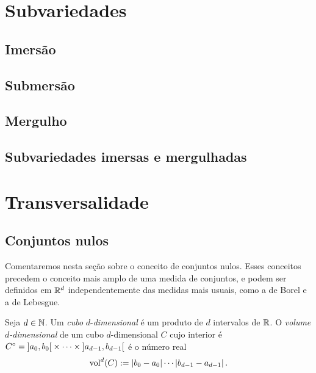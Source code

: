 \section{Subvariedades}

\subsection{Imersão}

\subsection{Submersão}

\subsection{Mergulho}

\subsection{Subvariedades imersas e mergulhadas}








\section{Transversalidade}

\subsection{Conjuntos nulos}

Comentaremos nesta seção sobre o conceito de conjuntos nulos. Esses conceitos precedem o conceito mais amplo de uma medida de conjuntos, e podem ser definidos em $\mathbb{R}^d$ independentemente das medidas mais usuais, como a de Borel e a de Lebesgue.

\begin{definition}
Seja $d \in \mathbb{N}$. Um \emph{cubo} $d$-\emph{dimensional} é um produto de $d$ intervalos de $\mathbb{R}$. O \emph{volume $d$-dimensional} de um cubo $d$-dimensional $C$ cujo interior é ${C}^\circ = \left]{a_0},{b_0}\right[ \times \cdots \times \left]{a_{d-1}},{b_{d-1}}\right[$ é o número real
	\begin{equation*}
	\operatorname{vol}^d(C) := \left\vert{b_0 - a_0}\right\vert\cdots\left\vert{b_{d-1} - a_{d-1}}\right\vert.
	\end{equation*}
\end{definition}

